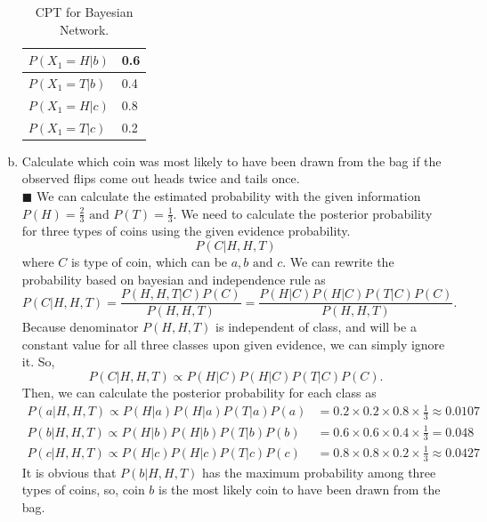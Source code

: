 \documentclass{article}
\newcommand{\solution}[1]{~\\ $\blacksquare$ \sffamily\upshape\selectfont #1
\normalfont ~\\~ }
\begin{document}
\begin{enumerate}[a.]
{\begin{table}[h]
\begin{tabular}{l|l}
      $P(X_1=H|b)$ & 0.6 \\ \midrule
      $P(X_1=T|b)$ & 0.4 \\ \midrule 
      $P(X_1=H|c)$ & 0.8 \\ \midrule 
      $P(X_1=T|c)$ & 0.2 \\ \bottomrule
    \end{tabular}
    \caption{CPT for Bayesian Network.}
    \label{tbl:ai-hwk2-14-1}
  \end{table}
  }
\item Calculate which coin was most likely to have been drawn from the
  bag if the observed flips come out heads twice and tails once.
  \solution{
    We can calculate the estimated probability with the given
    information $P(H)=\frac{2}{3} \mbox{ and } P(T)=\frac{1}{3}$. We
    need to calculate the posterior probability for three types of coins
    using the given evidence probability. 
    \[ P(C|H,H,T) \] where $C$ is type of coin, which can be $a,b
    \mbox{ and } c$. We can rewrite the probability based on bayesian
    and independence rule as \[ P(C|H,H,T) = \frac{P(H,H,T|C)P(C)}{P(H,H,T)} =
    \frac{P(H|C)P(H|C)P(T|C)P(C)}{P(H,H,T)}. \]
    Because denominator $P(H,H,T)$ is independent of class, and will
    be a constant value for all three classes upon given evidence, we
    can simply ignore it. So, \[ P(C|H,H,T) \propto P(H|C)P(H|C)P(T|C)P(C). \]
    Then, we can calculate the posterior probability for each class as
    \begin{align*}
      P(a|H,H,T) \propto P(H|a)P(H|a)P(T|a)P(a) & =
      0.2\times 0.2\times 0.8 \times \frac{1}{3} \approx 0.0107 \\
      P(b|H,H,T) \propto P(H|b)P(H|b)P(T|b)P(b) & =
      0.6\times 0.6\times 0.4 \times \frac{1}{3} = 0.048 \\
      P(c|H,H,T) \propto P(H|c)P(H|c)P(T|c)P(c) & =
      0.8\times 0.8\times 0.2 \times \frac{1}{3} \approx 0.0427 
    \end{align*}
    It is obvious that $P(b|H,H,T)$ has the maximum probability among
    three types of coins, so, coin $b$ is the most likely coin to have
    been drawn from the bag. 
  }
\end{enumerate}
\end{document}
